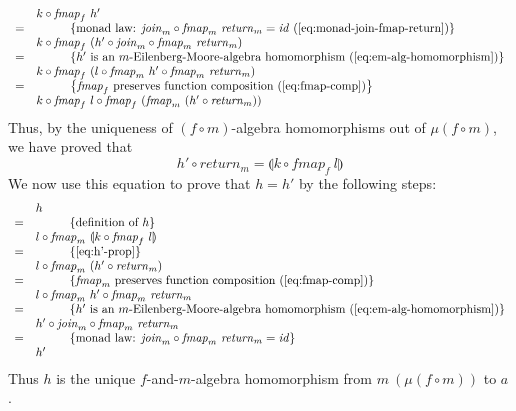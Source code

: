 \documentclass{jfp1}
\newcommand{\fold}[1]{\llparenthesis #1 \rrparenthesis}
\newcommand{\eqAnnotationS}[1]{\hspace{1cm}\left\{\textrm{#1}\right\}}
\begin{document}
\begin{proof*}
\begin{enumerate}
\begin{displaymath}
\begin{array}{cl}
        & k \circ \mathit{fmap}_f~h' \\
        =&\eqAnnotationS{monad law: $\mathit{join}_m \circ \mathit{fmap}_m~\mathit{return}_m = \mathit{id}$ (\autoref{eq:monad-join-fmap-return})} \\
        & k \circ \mathit{fmap}_f~(h' \circ \mathit{join}_m \circ \mathit{fmap}_m~\mathit{return}_m) \\
        =&\eqAnnotationS{$h'$ is an $m$-Eilenberg-Moore-algebra homomorphism (\autoref{eq:em-alg-homomorphism})} \\
        & k \circ \mathit{fmap}_f~(l \circ \mathit{fmap}_m~h' \circ \mathit{fmap}_m~\mathit{return}_m) \\
        =&\eqAnnotationS{$\mathit{fmap}_f$ preserves function composition (\autoref{eq:fmap-comp})} \\
        & k \circ \mathit{fmap}_f~l \circ \mathit{fmap}_f~(\mathit{fmap}_m~(h' \circ \mathit{return}_m))
      \end{array}
    \end{displaymath}
    Thus, by the uniqueness of $(f \circ m)$-algebra homomorphisms out
    of $\mu(f \circ m)$, we have proved that 
    \begin{equation}\label{eq:h'-prop}
      h' \circ \mathit{return}_m = \fold{k \circ \mathit{fmap}_f~l}
    \end{equation}
    We now use this equation to prove that $h=h'$ by the following
    steps:
    \begin{displaymath}
      \begin{array}{cl}
        & h \\
        =&\eqAnnotationS{definition of $h$} \\
        &l \circ \mathit{fmap}_m~\fold{k \circ \mathit{fmap}_f~l} \\
        =&\eqAnnotationS{\autoref{eq:h'-prop}} \\
        &l \circ \mathit{fmap}_m~(h' \circ \mathit{return}_m) \\
        =&\eqAnnotationS{$\mathit{fmap}_m$ preserves function composition (\autoref{eq:fmap-comp})} \\
        &l \circ \mathit{fmap}_m~{h'} \circ \mathit{fmap}_m~\mathit{return}_m \\
        =&\eqAnnotationS{$h'$ is an $m$-Eilenberg-Moore-algebra homomorphism (\autoref{eq:em-alg-homomorphism})} \\
        &h' \circ \mathit{join}_m \circ \mathit{fmap}_m~\mathit{return}_m \\
        =&\eqAnnotationS{monad law: $\mathit{join}_m \circ \mathit{fmap}_m~\mathit{return}_m = \mathit{id}$} \\
        &h'
      \end{array}
    \end{displaymath}
    Thus $h$ is the unique $f$-and-$m$-algebra homomorphism from
    $m~(\mu (f \circ m))$ to $a$. \mathproofbox
  \end{enumerate}
\end{proof*}
\end{document}
